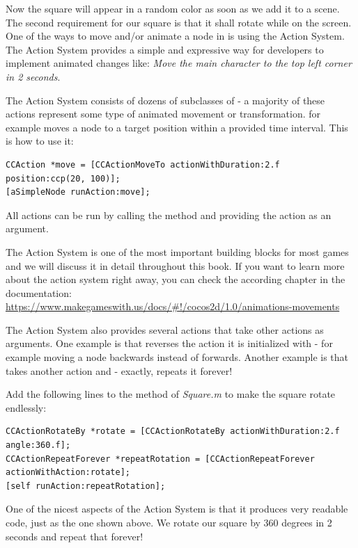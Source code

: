 Now the square will appear in a random color as soon as we add it to a scene.
The second requirement for our square is that it shall rotate while on the
screen. One of the ways to move and/or animate a node in \cocos{} is using the
\cocos{} Action System. The Action System provides a simple
and expressive way for developers to implement animated changes like:
\textit{Move the main character to the top left corner in 2 seconds}. 

The Action System consists of
dozens of subclasses of \inlinecode{\ccaction{}} - a majority of these actions represent some type of animated movement or
transformation.  for example moves a node to a
target position within a provided time interval. This is how to use it:
\begin{lstlisting}
CCAction *move = [CCActionMoveTo actionWithDuration:2.f position:ccp(20, 100)];
[aSimpleNode runAction:move];
\end{lstlisting}
All actions can be run by calling the  method and
providing the action as an argument. 

\begin{details}[frametitle={More about the
\cocos{} Action System}] The \cocos{} Action System is one of the most
important building blocks for most games and we will discuss it in detail
throughout this book. If you want to learn more about the \cocos{} action system
right away, you can check the according chapter in the \cocos{} documentation:
\url{https://www.makegameswith.us/docs/#!/cocos2d/1.0/animations-movements}
\end{details}

The Action System also provides several actions that take other actions as
arguments. One example is  that reverses the action
it is initialized with - for example moving a node backwards instead of
forwards. Another example is  that takes
another action and - exactly, repeats it forever!

Add the following lines to the  method of \textit{Square.m}
to make the square rotate endlessly:
\begin{lstlisting}
CCActionRotateBy *rotate = [CCActionRotateBy actionWithDuration:2.f angle:360.f];
CCActionRepeatForever *repeatRotation = [CCActionRepeatForever actionWithAction:rotate];
[self runAction:repeatRotation];
\end{lstlisting}
One of the nicest aspects of the Action System is that it produces very readable
code, just as the one shown above. We rotate our square by 360 degrees in 2
seconds and repeat that forever!


